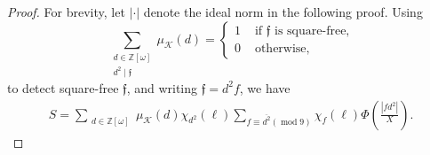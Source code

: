 \documentclass[11pt]{amsart}
\numberwithin{equation}{section}
\newcommand{\mymod}[1]{(\operatorname{mod} #1)}
\theoremstyle{remark}
\begin{document}
\begin{proof} For brevity, let $|\cdot|$ denote the ideal norm in the following proof. Using 
\begin{equation}\label{detect-square}
\sum_{\substack{d\in \mathbb{Z}[\omega]\\d^2\mid \mathfrak{f}}}\mu_\mathcal{K}(d)=\begin{cases}
    1 &\text{ if } \mathfrak{f} \text{ is square-free,}\\
    0 &\text{ otherwise,}
\end{cases}
\end{equation}
to detect square-free $\mathfrak{f}$, and writing $\mathfrak{f}=d^2f$, we have
    \begin{align*}
    S
    =
    \sum_{\substack{d\in \mathbb{Z}[\omega]}}\mu_\mathcal{K}(d)\chi_{d^2}(\ell)
    \sum_{f \equiv \overline{d^2}\mymod9}\chi_{f}(\ell)\Phi\left(\frac{|fd^2|}{X}\right).
\end{align*}


\end{proof}
\end{document}
